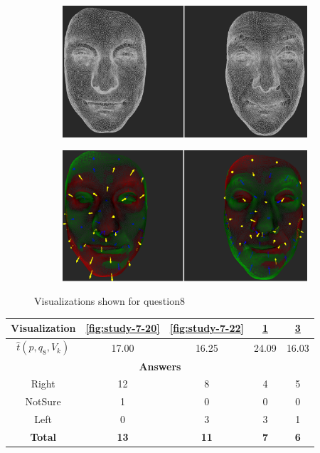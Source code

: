 \begin{figure}[h]
\begin{subfigure}{0.4\textwidth}
\includegraphics[width=\textwidth]{./screenshots/pair19.PNG}
\caption{}
\label{fig:study-7-19}
\end{subfigure}
\quad
\begin{subfigure}{0.4\textwidth}
\includegraphics[width=\textwidth]{./screenshots/pair21.PNG}
\caption{}
\label{fig:study-7-21}
\end{subfigure}
\caption{Visualizations shown for question8}
\end{figure}
\medskip

\begin{center}
\begin{tabular}{| c | c | c | c | c |}
	\hline
	Visualization & \ref{fig:study-7-20} & \ref{fig:study-7-22} & \ref{fig:study-7-19} & \ref{fig:study-7-21}\\ \hline
	\(\widehat{t}(p, q_8, V_k)\) & 17.00 & 16.25 & 24.09 & 16.03\\ \hline
	\multicolumn{5}{|c|}{\bf Answers} \\ \hline
	Right & 12 & 8 & 4 & 5\\ \hline
	NotSure & 1 & 0 & 0 & 0\\ \hline
	Left & 0 & 3 & 3 & 1\\ \hline
	{\bf Total} & {\bf 13} & {\bf 11} & {\bf 7} & {\bf 6}\\ \hline
\end{tabular}
\end{center}
\clearpage

